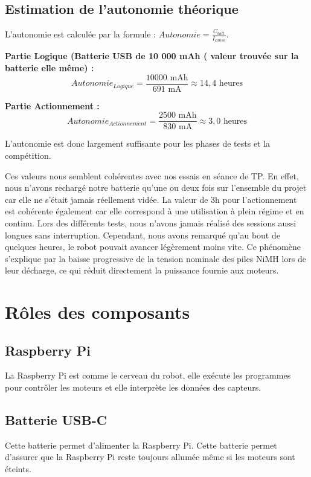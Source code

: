 \subsection{Estimation de l'autonomie théorique}

L'autonomie est calculée par la formule : $Autonomie = \frac{C_{batt}}{I_{conso}}$.

\textbf{Partie Logique (Batterie USB de 10 000 mAh ( valeur trouvée sur la batterie elle même) :}
\begin{equation}
Autonomie_{Logique} = \frac{10 000 \text{ mAh}}{691 \text{ mA}} \approx 14, 4 \text{ heures}
\end{equation}

\textbf{Partie Actionnement :}
\begin{equation}
Autonomie_{Actionnement} = \frac{2500 \text{ mAh}}{830 \text{ mA}} \approx 3,0 \text{ heures}
\end{equation}

L'autonomie est donc largement suffisante pour les phases de tests et la compétition.

Ces valeurs nous semblent cohérentes avec nos essais en séance de TP. En effet, nous n'avons rechargé notre batterie qu'une ou deux fois sur l'ensemble du projet car elle ne s'était jamais réellement vidée. La valeur de 3h pour l'actionnement est cohérente également car elle correspond à une utilisation à plein régime et en continu. Lors des différents tests, nous n'avons jamais réalisé des sessions aussi longues sans interruption. Cependant, nous avons remarqué qu'au bout de quelques heures, le robot pouvait avancer légèrement moins vite. Ce phénomène s'explique par la baisse progressive de la tension nominale des piles NiMH lors de leur décharge, ce qui réduit directement la puissance fournie aux moteurs.

\section{Rôles des composants}

\subsection{Raspberry Pi}
La Raspberry Pi est comme le cerveau du robot, elle exécute les programmes pour contrôler les moteurs et elle interprète les données des capteurs.

\subsection{Batterie USB-C}
Cette batterie permet d'alimenter la Raspberry Pi. Cette batterie permet d'assurer que la Raspberry Pi reste toujours allumée même si les moteurs sont éteints.

